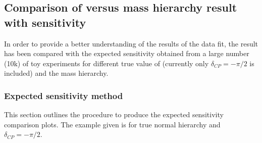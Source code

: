 \subsection {Comparison of \deltacp versus mass hierarchy result with sensitivity}
\label{sec:results:brazilian}

In order to provide a better understanding of the results of the \RunPeriod data fit, the result has been compared with the expected sensitivity obtained from a large number (10k) of toy experiments for different true value of \deltacp (currently only $\delta_{CP} = -\pi/2$ is included) and the mass hierarchy.

\subsubsection{Expected sensitivity method}
\label{sec:results:brazilian:method}
This section outlines the procedure to produce the expected sensitivity comparison plots. The example given is for true normal hierarchy and $\delta_{CP} = -\pi/2$.
